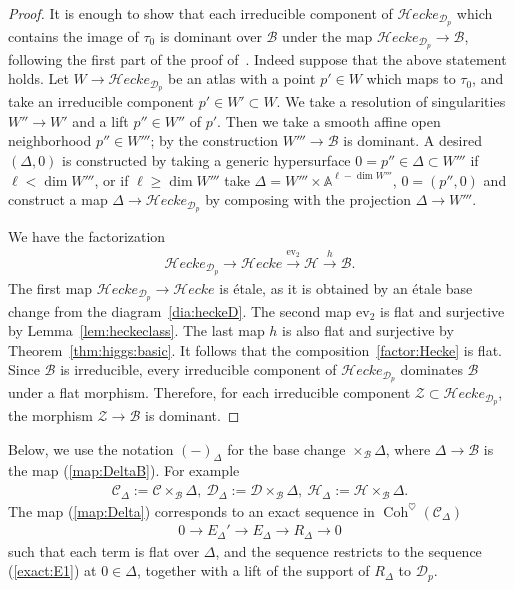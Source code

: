 \documentclass[11pt,oneside,a4paper,mathscr]{amsart}
\theoremstyle{definition}
\renewcommand{\geq}{\geqslant}
\newcommand{\cH}{\mathcal{H}}
\newcommand{\cB}{\mathcal{B}}
\newcommand{\cC}{\mathcal{C}}
\newcommand{\cD}{\mathcal{D}}
\newcommand{\ev}{\mathrm{ev}}
\newcommand{\cHecke}{\mathcal{H}ecke}
\newcommand{\Coh}{\operatorname{Coh}}
\begin{document}
\begin{proof}
    It is enough to show that each irreducible component of $\cHecke_{\cD_p}$ which contains the image of $\tau_0$
    is dominant over $\cB$
    under the map $\cHecke_{\cD_p} \to \cB$, following the first part of the proof of~\cite[Lemma~5.3]{TodaGL2}. Indeed suppose that the above statement holds. Let $W\to \cHecke_{\cD_p}$ be an atlas with a point $p'\in W$ 
which maps to $\tau_0$, and take an irreducible component $p' \in W' \subset W$. 
We take a resolution of singularities $W'' \to W'$ and a lift $p'' \in W''$ of $p'$. Then we take a smooth affine open neighborhood 
$p''\in W'''$; by the construction $W''' \to \cB$ is dominant. A desired $(\Delta, 0)$ is 
constructed by taking a generic hypersurface $0=p'' \in \Delta \subset W'''$
if $\ell<\dim W'''$, or if $\ell \geq \dim W'''$ take $\Delta=W''' \times \mathbb{A}^{\ell-\dim W'''}$, $0=(p'', 0)$ and construct a map $\Delta \to \cHecke_{\cD_p}$ by 
composing with the projection $\Delta \to W'''$.

We have the factorization 
\begin{align}\label{factor:Hecke}
    \cHecke_{\cD_p} \to \cHecke \stackrel{\ev_2}{\to} \cH \stackrel{h}{\to} \cB.
\end{align}
The first map $\cHecke_{\cD_p} \to \cHecke$ is \'{e}tale, as it is obtained by 
an \'{e}tale base change from the diagram~\eqref{dia:heckeD}.
The second map $\ev_2$ is flat and surjective by Lemma~\ref{lem:heckeclass}.
The last map $h$ is also flat and surjective by Theorem~\ref{thm:higgs:basic}. 
It follows that the composition~\eqref{factor:Hecke} is flat. 
Since $\cB$ is irreducible, every irreducible component of 
$\cHecke_{\cD_p}$ dominates $\cB$ under a flat morphism. 
Therefore, for each irreducible component 
$\mathcal{Z} \subset \cHecke_{\cD_p}$, the morphism 
$\mathcal{Z} \to \cB$ is dominant.

 
\end{proof}



Below, we use the notation $(-)_{\Delta}$ for the base change $\times_{\cB}\Delta$, where $\Delta \to \cB$ is the map (\ref{map:DeltaB}). 
For example 
\begin{align*}
    \cC_{\Delta}:=\cC\times_{\cB} \Delta, \ \cD_{\Delta}:=\cD\times_{\cB} \Delta, \ \cH_{\Delta}:=\cH\times_{\cB}\Delta.
\end{align*}
The map (\ref{map:Delta}) corresponds to an exact sequence 
in $\Coh^{\heartsuit}(\cC_{\Delta})$
\begin{align}\label{exact:EQ}
    0\to E_{\Delta}'\to E_{\Delta} \to R_{\Delta}\to 0
\end{align}
such that each term is flat over $\Delta$, and the sequence restricts to the 
sequence (\ref{exact:E1}) at $0\in \Delta$, together 
with a lift of the support of $R_{\Delta}$ to $\cD_{p}$. 
\end{document}
